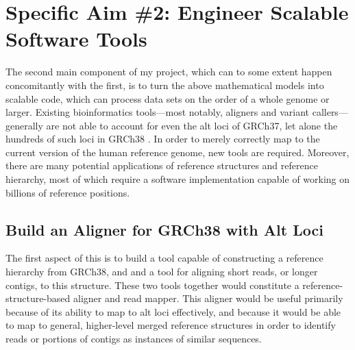 \documentclass[11pt,proposal]{ucthesis}
\begin{document}
        
        
        
    
    
        
        
\section{Specific Aim \#2: Engineer Scalable Software Tools}
\label{sec:aim2}

The second main component of my project, which can to some extent happen concomitantly with the first, is to turn the above mathematical models into scalable code, which can process data sets on the order of a whole genome or larger. Existing bioinformatics tools---most notably, aligners and variant callers---generally are not able to account for even the alt loci of GRCh37, let alone the hundreds of such loci in GRCh38 \cite{church2014story}. In order to merely correctly map to the current version of the human reference genome, new tools are required. Moreover, there are many potential applications of reference structures and reference hierarchy, most of which require a software implementation capable of working on billions of reference positions.

\subsection{Build an Aligner for GRCh38 with Alt Loci}

The first aspect of this is to build a tool capable of constructing a reference hierarchy from GRCh38, and and a tool for aligning short reads, or longer contigs, to this structure. These two tools together would constitute a reference-structure-based aligner and read mapper. This aligner would be useful primarily because of its ability to map to alt loci effectively, and because it would be able to map to general, higher-level merged reference structures in order to identify reads or portions of contigs as instances of similar sequences.
\end{document}
